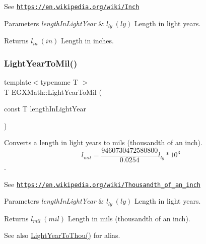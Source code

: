 See \href{https://en.wikipedia.org/wiki/Inch}{\tt https\+://en.\+wikipedia.\+org/wiki/\+Inch} 
\begin{DoxyParams}{Parameters}
{\em length\+In\+Light\+Year} & $ l_{ly}\ (ly)$ Length in light years. \\
\hline
\end{DoxyParams}
\begin{DoxyReturn}{Returns}
$ l_{in}\ (in)$ Length in inches. 
\end{DoxyReturn}
\mbox{\label{group___e_g_x_math-_conversions-_length_conversions-_astronomical-_light_year-_imperial_ga980a3d37f73ebc5f217366ee01e7b4ae}} 
\subsubsection{\texorpdfstring{Light\+Year\+To\+Mil()}{LightYearToMil()}}
{\footnotesize\ttfamily template$<$typename T $>$ \\
T E\+G\+X\+Math\+::\+Light\+Year\+To\+Mil (\begin{DoxyParamCaption}\item[{const T}]{length\+In\+Light\+Year }\end{DoxyParamCaption})}



Converts a length in light years to mils (thousandth of an inch). \[ l_{mil}= \frac{9460730472580800}{0.0254} l_{ly} * 10^{3} \]. 

See \href{https://en.wikipedia.org/wiki/Thousandth_of_an_inch}{\tt https\+://en.\+wikipedia.\+org/wiki/\+Thousandth\+\_\+of\+\_\+an\+\_\+inch} 
\begin{DoxyParams}{Parameters}
{\em length\+In\+Light\+Year} & $ l_{ly}\ (ly)$ Length in light years. \\
\hline
\end{DoxyParams}
\begin{DoxyReturn}{Returns}
$ l_{mil}\ (mil)$ Length in mils (thousandth of an inch). 
\end{DoxyReturn}
\begin{DoxySeeAlso}{See also}
\mbox{\hyperlink{group___e_g_x_math-_conversions-_length_conversions-_astronomical-_light_year-_imperial_ga84d83b078dfeb11c1cdaca84b4f988cb}{Light\+Year\+To\+Thou()}} for alias. 
\end{DoxySeeAlso}
\mbox{\label{group___e_g_x_math-_conversions-_length_conversions-_astronomical-_light_year-_imperial_ga3f6a914c8896334f1be6425107a34827}} 

